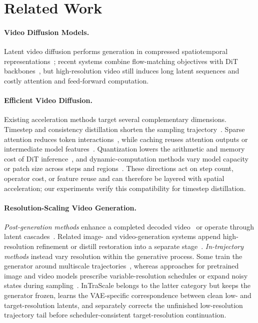 \documentclass[letterpaper]{article} %
\begin{document}
\section{Related Work}

\paragraph{Video Diffusion Models.}
Latent video diffusion performs generation in compressed spatiotemporal
representations~\citep{blattmann2023videoldm}; recent systems combine
flow-matching objectives with DiT backbones~\citep{jin2025pyramidalflow,wan2025},
but high-resolution video still induces long latent sequences and costly
attention and feed-forward computation.

\paragraph{Efficient Video Diffusion.}
Existing acceleration methods target several complementary dimensions.
Timestep and consistency distillation shorten the sampling
trajectory~\citep{wang2023videolcm,li2024t2vturbo,ding2025dollar,nie2026tmd}.
Sparse attention reduces token interactions~\citep{xi2025sparsevideogen},
while caching reuses attention outputs or intermediate model
features~\citep{zhao2025pab,liu2025teacache,zou2026disca}. Quantization lowers
the arithmetic and memory cost of DiT inference~\citep{zhao2025viditq}, and
dynamic-computation methods vary model capacity or patch size across steps and
regions~\citep{anagnostidis2025flexidit,kim2026ddit,li2026dynapatch}. These
directions act on step count, operator cost, or feature reuse and can therefore
be layered with spatial acceleration; our experiments verify this
compatibility for timestep distillation.

\paragraph{Resolution-Scaling Video Generation.}
\emph{Post-generation methods} enhance a completed decoded
video~\citep{zhou2024upscale,xu2025videogigagan,he2024venhancer} or operate through
latent cascades~\citep{xie2026simplegvr,zhao2026luve}. Related image- and
video-generation systems append high-resolution refinement or distill
restoration into a separate stage~\citep{zheng2026mrflow,zhuang2026flashvsr}.
\emph{In-trajectory methods} instead vary resolution within the generative
process. Some train the generator around multiscale
trajectories~\citep{gu2024matryoshka,jin2025pyramidalflow}, whereas approaches for
pretrained image and video models prescribe variable-resolution schedules or
expand noisy states during sampling~\citep{jeong2026ralu,lightx2v2025,
zheng2026fresco,xiao2026spectral}. InTraScale belongs to the latter category
but keeps the generator frozen, learns the VAE-specific correspondence between
clean low- and target-resolution latents, and separately corrects the
unfinished low-resolution trajectory tail before scheduler-consistent
target-resolution continuation.
\end{document}
